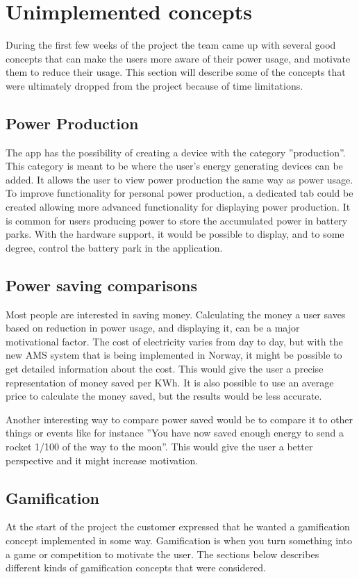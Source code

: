 \newpage
\section{Unimplemented concepts}
During the first few weeks of the project the team came up with several good concepts that can make the users more aware of their power usage, and motivate them to reduce their usage. This section will describe some of the concepts that were ultimately dropped from the project because of time limitations.

\subsection{Power Production}
The app has the possibility of creating a device with the category ''production''. This category is meant to be where the user's energy generating devices can be added. It allows the user to view power production the same way as power usage. To improve functionality for personal power production, a dedicated tab could be created allowing more advanced functionality for displaying power production.
It is common for users producing power to store the accumulated power in battery parks. With the hardware support, it would be possible to display, and to some degree, control the battery park in the application.

\subsection{Power saving comparisons}
\label{sec:psc}
Most people are interested in saving money. Calculating the money a user saves based on reduction in power usage, and displaying it, can be a major motivational factor. The cost of electricity varies from day to day, but with the new AMS\cite{ams} system that is being implemented in Norway, it might be possible to get detailed information about the cost. This would give the user a precise representation of money saved per KWh. It is also possible to use an average price to calculate the money saved, but the results would be less accurate.

Another interesting way to compare power saved would be to compare it to other things or events like for instance ''You have now saved enough energy to send a rocket 1/100 of the way to the moon''. This would give the user a better perspective and it might increase motivation.

\subsection{Gamification}
At the start of the project the customer expressed that he wanted a gamification concept implemented in some way. Gamification is when you turn something into a game or competition to motivate the user. The sections below describes different kinds of gamification concepts that were considered.


